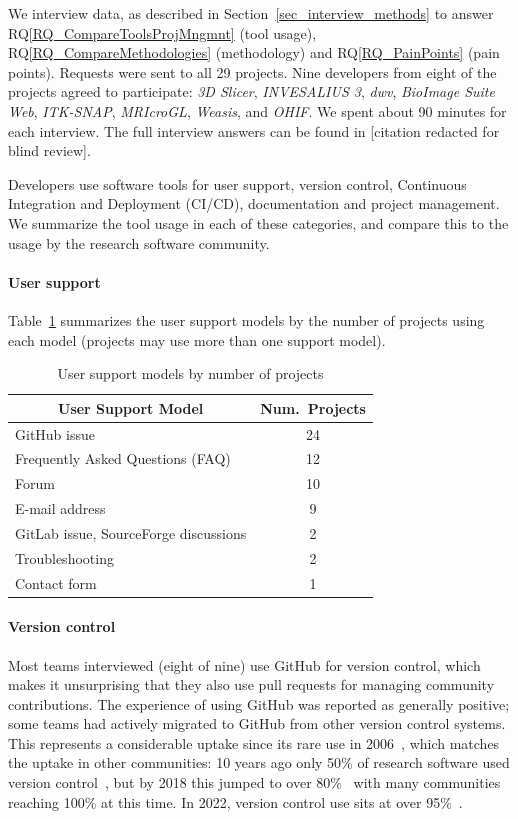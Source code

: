 \documentclass[doubleblind,12pt, 3p, times]{elsarticle}
\newcommand{\rqref}[1]{RQ\ref{#1}}
\begin{document}
We interview data, as described in Section~\ref{sec_interview_methods}
to answer \rqref{RQ_CompareToolsProjMngmnt} (tool usage),
\rqref{RQ_CompareMethodologies} (methodology) and \rqref{RQ_PainPoints} (pain
points). Requests were sent to all 29 projects.  Nine developers from eight of
the projects agreed to participate: \textit{3D Slicer}, \textit{INVESALIUS 3},
\textit{dwv}, \textit{BioImage Suite Web}, \textit{ITK-SNAP},
\textit{MRIcroGL}, \textit{Weasis}, and \textit{OHIF}. We spent about 90
minutes for each interview. The full interview answers can be
found in [citation redacted for blind review].

Developers use software tools for user support, version control,
Continuous Integration and Deployment (CI/CD), documentation and project
management.  We summarize the tool usage in each of these categories, and
compare this to the usage by the research software community.

\paragraph{User support} Table~\ref{tab_user_support_model} summarizes the user
support models by the number of projects using each model (projects may use
more than one support model).

\begin{table}[ht!]
\centering
\begin{tabular}{lc}
\toprule
\multicolumn{1}{c}{User Support Model} & Num.\ Projects \\
\midrule
GitHub issue & 24 \\
Frequently Asked Questions (FAQ) & 12 \\
Forum & 10 \\
E-mail address & 9 \\
GitLab issue, SourceForge discussions & 2 \\
Troubleshooting & 2 \\
Contact form & 1 \\ 
\bottomrule
\end{tabular}
\caption{\label{tab_user_support_model}User support models by number of projects}
\end{table}

\paragraph{Version control} Most teams interviewed (eight of nine) use GitHub
for version control, which makes it unsurprising that they also use pull
requests for managing community contributions. The experience of using GitHub
was reported as generally positive; some teams had actively migrated to GitHub
from other version control systems.  This represents a considerable uptake since
its rare use in 2006~\cite{Wilson2006}, which matches the uptake in other
communities: 10 years ago only 50\% of research software used version
control~\cite{Nguyen-HoanEtAl2010}, but by 2018 this jumped to over
80\%~\cite{AlNoamanyAndBorghi2018} with many communities~\cite{Smith2018}
reaching 100\% at this time. In 2022, version control use sits at over
95\%~\cite{CarverEtAl2022}.
\end{document}
